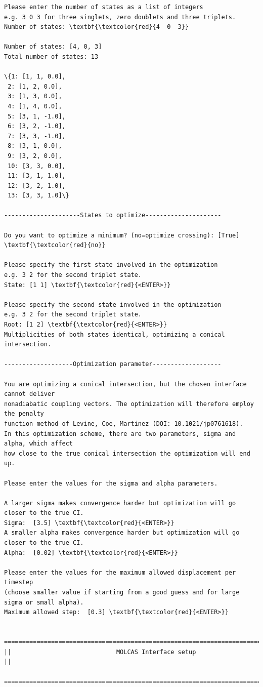 \documentclass[a4paper,11pt,DIV=15,openany]{scrbook}
\begin{document}
\begin{oframed}
\begin{Verbatim}[commandchars=\\\{\}]
Please enter the number of states as a list of integers
e.g. 3 0 3 for three singlets, zero doublets and three triplets.
Number of states: \textbf{\textcolor{red}{4  0  3}}

Number of states: [4, 0, 3]
Total number of states: 13

\{1: [1, 1, 0.0],
 2: [1, 2, 0.0],
 3: [1, 3, 0.0],
 4: [1, 4, 0.0],
 5: [3, 1, -1.0],
 6: [3, 2, -1.0],
 7: [3, 3, -1.0],
 8: [3, 1, 0.0],
 9: [3, 2, 0.0],
 10: [3, 3, 0.0],
 11: [3, 1, 1.0],
 12: [3, 2, 1.0],
 13: [3, 3, 1.0]\}

---------------------States to optimize---------------------

Do you want to optimize a minimum? (no=optimize crossing): [True] \textbf{\textcolor{red}{no}}

Please specify the first state involved in the optimization
e.g. 3 2 for the second triplet state.
State: [1 1] \textbf{\textcolor{red}{<ENTER>}}

Please specify the second state involved in the optimization
e.g. 3 2 for the second triplet state.
Root: [1 2] \textbf{\textcolor{red}{<ENTER>}}
Multiplicities of both states identical, optimizing a conical intersection.

-------------------Optimization parameter-------------------

You are optimizing a conical intersection, but the chosen interface cannot deliver 
nonadiabatic coupling vectors. The optimization will therefore employ the penalty 
function method of Levine, Coe, Martinez (DOI: 10.1021/jp0761618).
In this optimization scheme, there are two parameters, sigma and alpha, which affect 
how close to the true conical intersection the optimization will end up.

Please enter the values for the sigma and alpha parameters.

A larger sigma makes convergence harder but optimization will go closer to the true CI.
Sigma:  [3.5] \textbf{\textcolor{red}{<ENTER>}}
A smaller alpha makes convergence harder but optimization will go closer to the true CI.
Alpha:  [0.02] \textbf{\textcolor{red}{<ENTER>}}

Please enter the values for the maximum allowed displacement per timestep 
(choose smaller value if starting from a good guess and for large sigma or small alpha).
Maximum allowed step:  [0.3] \textbf{\textcolor{red}{<ENTER>}}

  ================================================================================
||                             MOLCAS Interface setup                             ||
  ================================================================================


\end{Verbatim}
\end{oframed}
\end{document}
